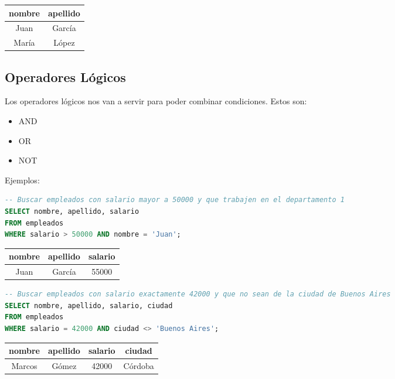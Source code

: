 \documentclass[12pt]{article}
\begin{document}
\begin{center}
\begin{tabular}{cc}
\toprule
nombre & apellido \\
\midrule
Juan & García \\
María & López \\
\bottomrule
\end{tabular}
\end{center}

\subsection{Operadores Lógicos}
Los operadores lógicos nos van a servir para poder combinar condiciones. Estos son:
\begin{itemize}
    \item AND
    \item OR
    \item NOT
\end{itemize}

\vspace{1em}

Ejemplos:
\begin{lstlisting}[language=SQL]
-- Buscar empleados con salario mayor a 50000 y que trabajen en el departamento 1
SELECT nombre, apellido, salario
FROM empleados
WHERE salario > 50000 AND nombre = 'Juan';
\end{lstlisting}

\begin{center}

\begin{tabular}{ccc}
\toprule
nombre & apellido & salario \\
\midrule
Juan & García & 55000 \\
\bottomrule
\end{tabular}
\end{center}

\begin{lstlisting}[language=SQL]
-- Buscar empleados con salario exactamente 42000 y que no sean de la ciudad de Buenos Aires
SELECT nombre, apellido, salario, ciudad
FROM empleados
WHERE salario = 42000 AND ciudad <> 'Buenos Aires';
\end{lstlisting}

\begin{center}
\begin{tabular}{cccc}
\toprule
nombre & apellido & salario & ciudad \\
\midrule
Marcos & Gómez & 42000 & Córdoba \\
\bottomrule
\end{tabular}
\end{center}
\end{document}
